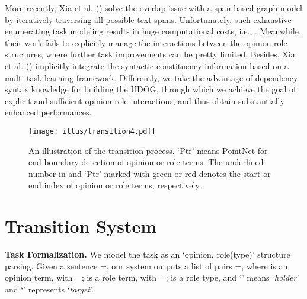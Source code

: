 \documentclass[letterpaper]{article} \usepackage{aaai22}  \usepackage{times}  \usepackage{helvet}  \usepackage{courier}  \usepackage[hyphens]{url}  \usepackage{graphicx} \urlstyle{rm} \def\UrlFont{\rm}  \usepackage{natbib}  \usepackage{caption} \DeclareCaptionStyle{ruled}{labelfont=normalfont,labelsep=colon,strut=off} \frenchspacing  \setlength{\pdfpagewidth}{8.5in}  \setlength{\pdfpageheight}{11in}  \usepackage{algorithm}
\begin{document}
More recently, Xia et al. (\citeyear{xia-etal-2021-unified}) solve the overlap issue with a span-based graph model by iteratively traversing all possible text spans.
Unfortunately, such exhaustive enumerating task modeling results in huge computational costs, i.e., .
Meanwhile, their work fails to explicitly manage the interactions between the opinion-role structures, where further task improvements can be pretty limited.
Besides, Xia et al. (\citeyear{xia-etal-2021-unified}) implicitly integrate the syntactic constituency information based on a multi-task learning framework.
Differently, we take the advantage of dependency syntax knowledge for building the UDOG, through which we achieve the goal of explicit and sufficient opinion-role interactions, and thus obtain substantially enhanced performances.

















\begin{figure*}[!t]
\centering
\texttt{[image: illus/transition4.pdf]}
\caption{
An illustration of the transition process. 
`Ptr' means PointNet for end boundary detection of opinion or role terms.
The underlined number in  and `Ptr' marked with green or red denotes the start or end index of opinion or role terms, respectively.
}
\label{Transition}
\end{figure*}













\section{Transition System}



\noindent\textbf{Task Formalization.}
We model the task as an `opinion, role(type)' structure parsing.
Given a sentence =, our system outputs a list of pairs =,
where  is an opinion term, with =;
 is a role term, with =;
 is a role type, and `' means `\emph{holder}' and `' represents `\emph{target}'.
\end{document}
